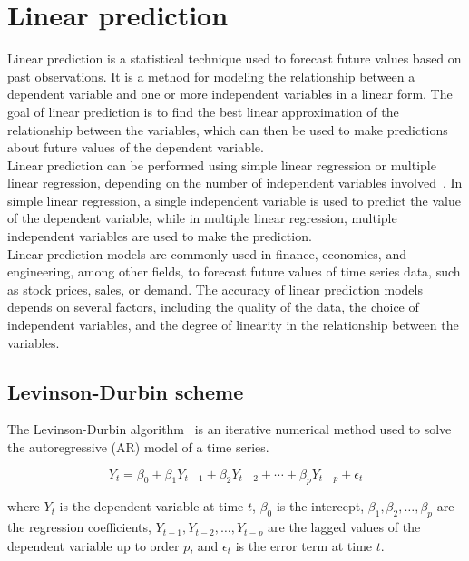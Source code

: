     \section{Linear prediction} \label{sec:lp}
    Linear prediction is a statistical technique used to forecast future values based on past observations. It is a method for modeling the
    relationship between a dependent variable and one or more independent variables in a linear form. The goal of linear prediction is to find
    the best linear approximation of the relationship between the variables, which can then be used to make predictions about future values of
    the dependent variable.
    \\
    Linear prediction can be performed using simple linear regression or multiple linear regression, depending on the number of independent variables
    involved~\cite{Parks}. In simple linear regression, a single independent variable is used to predict the value of the dependent variable,
    while in multiple linear
    regression, multiple independent variables are used to make the prediction.
    \\
    Linear prediction models are commonly used in finance, economics, and engineering, among other fields, to forecast future values of time series data,
    such as stock prices, sales, or demand. The accuracy of linear prediction models depends on several factors, including the quality of the data,
    the choice of independent variables, and the degree of linearity in the relationship between the variables.

    \subsection{Levinson-Durbin scheme} \label{subsec:levinson}

    The Levinson-Durbin algorithm~\cite{Levinson} is an iterative numerical method used to solve the autoregressive (AR) model of a time series.


    \begin{equation}
        Y_t = \beta_0 + \beta_1 Y_{t-1} + \beta_2 Y_{t-2} + \cdots + \beta_p Y_{t-p} + \epsilon_t
    \end{equation}

    where $Y_t$ is the dependent variable at time $t$, $\beta_0$ is the intercept, $\beta_1, \beta_2, \dots, \beta_p$ are the
    regression coefficients, $Y_{t-1}, Y_{t-2}, \dots, Y_{t-p}$ are the lagged values of the dependent variable up to order $p$, and $\epsilon_t$ is
    the error term at time $t$.

